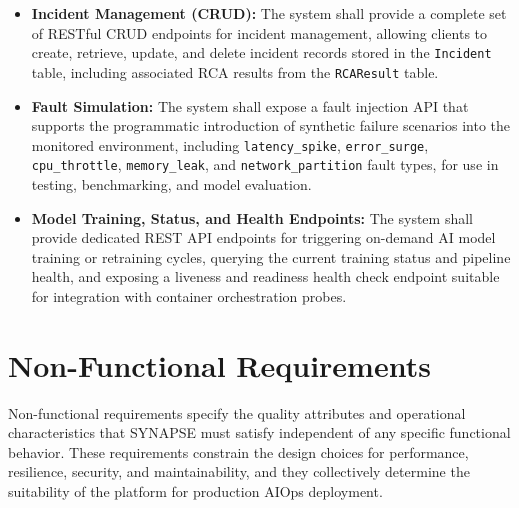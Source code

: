 \begin{itemize}
    \item \textbf{Incident Management (CRUD):} The system shall provide a complete set of RESTful CRUD endpoints for incident management, allowing clients to create, retrieve, update, and delete incident records stored in the \texttt{Incident} table, including associated RCA results from the \texttt{RCAResult} table.

    \item \textbf{Fault Simulation:} The system shall expose a fault injection API that supports the programmatic introduction of synthetic failure scenarios into the monitored environment, including \texttt{latency\_spike}, \texttt{error\_surge}, \texttt{cpu\_throttle}, \texttt{memory\_leak}, and \texttt{network\_partition} fault types, for use in testing, benchmarking, and model evaluation.

    \item \textbf{Model Training, Status, and Health Endpoints:} The system shall provide dedicated REST API endpoints for triggering on-demand AI model training or retraining cycles, querying the current training status and pipeline health, and exposing a liveness and readiness health check endpoint suitable for integration with container orchestration probes.

\end{itemize}

\section{Non-Functional Requirements}

\hspace*{0.3in} Non-functional requirements specify the quality attributes and operational characteristics that SYNAPSE must satisfy independent of any specific functional behavior. These requirements constrain the design choices for performance, resilience, security, and maintainability, and they collectively determine the suitability of the platform for production AIOps deployment.\\\\

